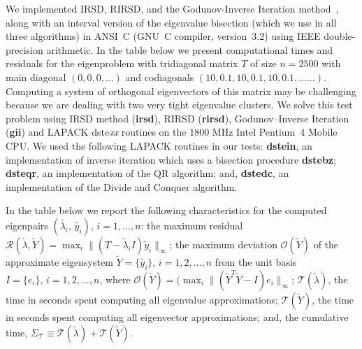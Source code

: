 \documentclass{report}
\begin{document}
We implemented IRSD, RIRSD, and the Godunov-Inverse Iteration
method~\cite{matsekh_imacs}, along with an interval version of
the eigenvalue bisection (which we use in all three algorithms)
in ANSI~C (GNU~C compiler, version~3.2) using IEEE
double-precision arithmetic. In the table below we present
computational times and residuals for the eigenproblem with
tridiagonal matrix $T$ of size $n=2500$ with main diagonal $(0,
0, 0, \ldots)$ and codiagonals $(10, 0.1, 10, 0.1, 10, 0.1,
...\ldots)$. Computing a system of orthogonal eigenvectors of
this matrix may be challenging because we are dealing with two very
tight eigenvalue clusters. We solve this test problem using
IRSD method (\textbf{irsd}), RIRSD (\textbf{rirsd}),
Godunov--Inverse Iteration (\textbf{gii}) and
LAPACK dste\emph{xx} routines on the 1800 MHz
Intel\textregistered{} Pentium~4 Mobile\textregistered{} CPU\@.
We used the following LAPACK routines in our tests:
\textbf{dstein}, an implementation of inverse iteration which
uses a bisection procedure \textbf{dstebz};
\textbf{dsteqr}, an implementation of the QR algorithm; and,
\textbf{dstedc}, an implementation of the Divide and Conquer algorithm.

In the table below we report the following characteristics for
the computed eigenpairs
$(\tilde{\lambda_i},\,\tilde{y_i}),\,i=1,\ldots, n$: the maximum
residual $\mathcal{R}(\tilde{\lambda}, \tilde{Y}) = \max_i \| (T
- \tilde{\lambda}_i I) \tilde{y}_i \|_\infty$; the maximum
deviation $\mathcal{O}(\tilde{Y})$ of the approximate eigensystem
$\tilde{Y} = \{\tilde{y_i}\},\, i = 1, 2, \ldots, n$ from the unit basis
$I = \{e_i\},\, i = 1, 2,\ldots, n$, where
$\mathcal{O}(\tilde{Y})=(\max_i \|(\tilde{Y}^T \tilde{Y} - I)
e_i\|_\infty$; $\mathcal{T}( \tilde{\lambda})$, the time in seconds spent
computing all eigenvalue
approximations; $\mathcal{T}( \tilde{Y})$, the time in seconds
spent computing all eigenvector approximations; and, the
cumulative time, $\Sigma_{\mathcal{T}} \equiv
\mathcal{T}(\tilde{\lambda}) + \mathcal{T}( \tilde{Y})$.
\end{document}
